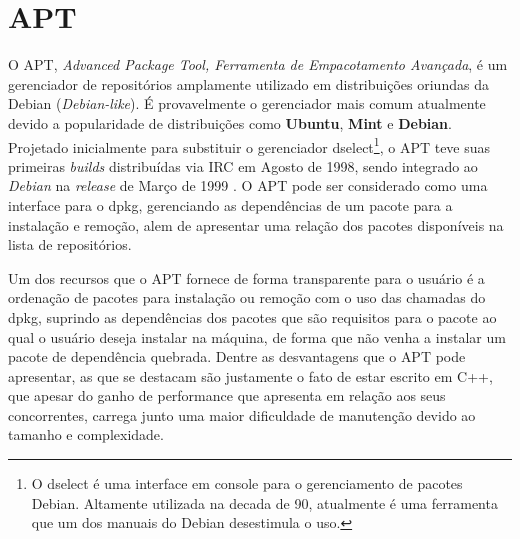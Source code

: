 \section{APT} %
\label{sec:apt}


O {\code APT}, \textit{Advanced Package Tool, Ferramenta de Empacotamento Avançada}, é um gerenciador de repositórios  amplamente utilizado em distribuições oriundas da Debian (\textit{Debian-like}).
É provavelmente o gerenciador mais comum atualmente devido a popularidade de distribuições como \textbf{Ubuntu}, \textbf{Mint} e \textbf{Debian}.
Projetado inicialmente para substituir o gerenciador {\code dselect}\footnote{O {\code dselect} é uma interface em console para o gerenciamento de pacotes Debian. Altamente utilizada na decada de 90, atualmente é uma ferramenta que um dos manuais do Debian \cite{dselect} desestimula o uso.}, o {\code APT} teve suas primeiras \textit{builds} distribuídas via IRC em Agosto de 1998,  sendo integrado ao \textit{Debian} na \textit{release} de Março de 1999 \cite{garbee2008brief}. O  {\code APT} pode ser considerado como uma interface para o {\code dpkg}, gerenciando as dependências de um pacote para a instalação e remoção, alem de apresentar uma relação dos pacotes disponíveis na lista de repositórios. 

Um dos recursos que o {\code APT} fornece de forma transparente para o usuário é a ordenação de pacotes para instalação ou remoção com o uso das chamadas do {\code dpkg}, suprindo as dependências dos pacotes que são requisitos para o pacote ao qual o usuário deseja instalar na máquina, de forma que não venha a instalar um pacote de dependência quebrada. Dentre as desvantagens que o {\code APT} pode apresentar, as que se destacam são justamente o fato de estar escrito em C++, que apesar do ganho de performance que apresenta em relação aos seus concorrentes, carrega junto uma maior dificuldade de manutenção devido ao tamanho e complexidade. 

